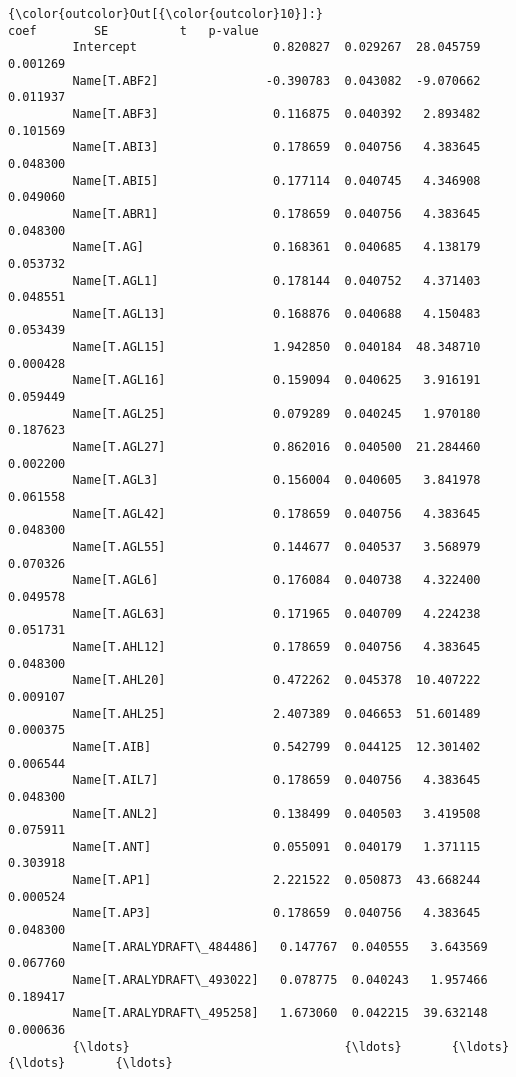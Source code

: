 \documentclass[11pt]{article}
\begin{document}
\begin{Verbatim}[commandchars=\\\{\}]
{\color{outcolor}Out[{\color{outcolor}10}]:}                                 coef        SE          t   p-value
         Intercept                   0.820827  0.029267  28.045759  0.001269
         Name[T.ABF2]               -0.390783  0.043082  -9.070662  0.011937
         Name[T.ABF3]                0.116875  0.040392   2.893482  0.101569
         Name[T.ABI3]                0.178659  0.040756   4.383645  0.048300
         Name[T.ABI5]                0.177114  0.040745   4.346908  0.049060
         Name[T.ABR1]                0.178659  0.040756   4.383645  0.048300
         Name[T.AG]                  0.168361  0.040685   4.138179  0.053732
         Name[T.AGL1]                0.178144  0.040752   4.371403  0.048551
         Name[T.AGL13]               0.168876  0.040688   4.150483  0.053439
         Name[T.AGL15]               1.942850  0.040184  48.348710  0.000428
         Name[T.AGL16]               0.159094  0.040625   3.916191  0.059449
         Name[T.AGL25]               0.079289  0.040245   1.970180  0.187623
         Name[T.AGL27]               0.862016  0.040500  21.284460  0.002200
         Name[T.AGL3]                0.156004  0.040605   3.841978  0.061558
         Name[T.AGL42]               0.178659  0.040756   4.383645  0.048300
         Name[T.AGL55]               0.144677  0.040537   3.568979  0.070326
         Name[T.AGL6]                0.176084  0.040738   4.322400  0.049578
         Name[T.AGL63]               0.171965  0.040709   4.224238  0.051731
         Name[T.AHL12]               0.178659  0.040756   4.383645  0.048300
         Name[T.AHL20]               0.472262  0.045378  10.407222  0.009107
         Name[T.AHL25]               2.407389  0.046653  51.601489  0.000375
         Name[T.AIB]                 0.542799  0.044125  12.301402  0.006544
         Name[T.AIL7]                0.178659  0.040756   4.383645  0.048300
         Name[T.ANL2]                0.138499  0.040503   3.419508  0.075911
         Name[T.ANT]                 0.055091  0.040179   1.371115  0.303918
         Name[T.AP1]                 2.221522  0.050873  43.668244  0.000524
         Name[T.AP3]                 0.178659  0.040756   4.383645  0.048300
         Name[T.ARALYDRAFT\_484486]   0.147767  0.040555   3.643569  0.067760
         Name[T.ARALYDRAFT\_493022]   0.078775  0.040243   1.957466  0.189417
         Name[T.ARALYDRAFT\_495258]   1.673060  0.042215  39.632148  0.000636
         {\ldots}                              {\ldots}       {\ldots}        {\ldots}       {\ldots}

\end{Verbatim}
\end{document}
